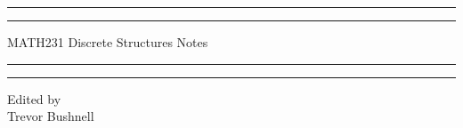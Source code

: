 \documentclass{package/notes}
\begin{document}
	\begin{titlepage} %
		
		\centering %
		
		\scshape %
		
		\vspace*{\baselineskip} %
		
		
		\rule{\textwidth}{1.6pt}\vspace*{-\baselineskip}\vspace*{2pt} %
		\rule{\textwidth}{0.4pt} %
		
		\vspace{0.75\baselineskip} %
		
		{\huge MATH231 Discrete Structures Notes\\} %
		
		\vspace{0.75\baselineskip} %
		
		\rule{\textwidth}{0.4pt}\vspace*{-\baselineskip}\vspace{3.2pt} %
		\rule{\textwidth}{1.6pt} %
		
		\vspace{2\baselineskip} %
		
		
		
		
		\vspace*{3\baselineskip} %
		
		
		
		\vspace{0.5\baselineskip} 
		
		
		
		\vspace{0.5\baselineskip} 
		
		
		
		\vfill 
		
		
		
		\vspace{0.3\baselineskip} 
		
		
		{\large Edited by\\  Trevor Bushnell} 
		
	\end{titlepage}
	\tableofcontents
\end{document}
